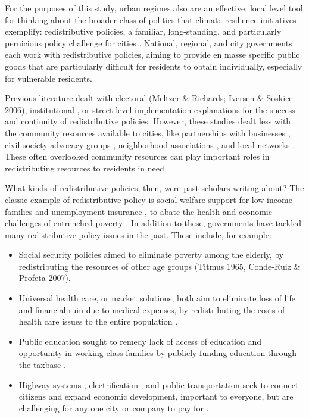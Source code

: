 \documentclass[preprint, 3p,
authoryear]{elsarticle} %
\begin{document}
For the purposes of this study, urban regimes also are an effective,
local level tool for thinking about the broader class of politics that
climate resilience initiatives exemplify: redistributive policies, a
familiar, long-standing, and particularly pernicious policy challenge
for cities
\citep{meltzer_and_scott_1981, pierson_1994, hacker_2004, iversen_and_soskice_2006, mettler_2011, rueda_and_stemueller_2019}.
National, regional, and city governments each work with redistributive
policies, aiming to provide en masse specific public goods that are
particularly difficult for residents to obtain individually, especially
for vulnerable residents.

Previous literature dealt with electoral (Meltzer \& Richards; Iversen
\& Soskice 2006), institutional
\citep{pierson_1994, hacker_2004, mettler_2011}, or street-level
implementation \citep{lipsky_1980, hupe_and_hill_2007} explanations for
the success and continuity of redistributive policies. However, these
studies dealt less with the community resources available to cities,
like partnerships with businesses
\citep{stone_1989, mossberger_and_stoker_2001}, civil society advocacy
groups \citep{portney_and_berry_2016}, neighborhood associations
\citep{logan_and_rabrenovic_1990}, and local networks
\citep{aldrich_and_meyer_2015}. These often overlooked community
resources can play important roles in redistributing resources to
residents in need \citep{aldrich_and_kioyta_2017, klinenberg_2018}.

What kinds of redistributive policies, then, were past scholars writing
about? The classic example of redistributive policy is social welfare
support for low-income families and unemployment insurance
\citep{pierson_1994, hacker_2004}, to abate the health and economic
challenges of entrenched poverty
\citep{ahammer_packham_2020, berkowitz_and_basu_2021}. In addition to
these, governments have tackled many redistributive policy issues in the
past. These include, for example:

\begin{itemize}
\item
  Social security policies aimed to eliminate poverty among the elderly,
  by redistributing the resources of other age groups (Titmus 1965,
  Conde-Ruiz \& Profeta 2007).
\item
  Universal health care, or market solutions, both aim to eliminate loss
  of life and financial ruin due to medical expenses, by redistributing
  the costs of health care issues to the entire population
  \citep{mettler_2011}.
\item
  Public education sought to remedy lack of access of education and
  opportunity in working class families by publicly funding education
  through the taxbase \citep{mettler_2005}.
\item
  Highway systems
  \citep{congleton_and_bennett_1995, zhu_and_brown_2013},
  electrification \citep{baker_and_phillips_2019, breetz_et_al_2018},
  and public transportation \citep{hood_2006} seek to connect citizens
  and expand economic development, important to everyone, but are
  challenging for any one city or company to pay for
  \citep{boarnet_and_haughwout_2000}.
\end{itemize}
\end{document}
